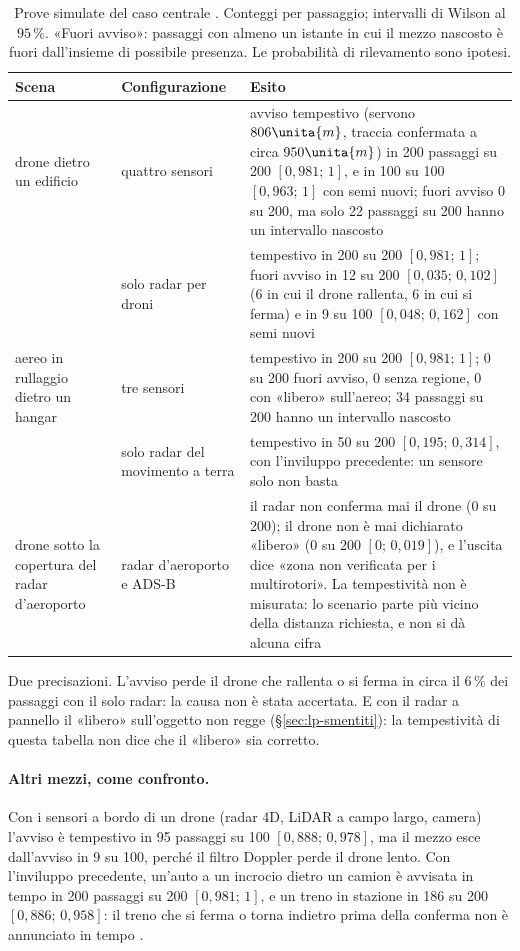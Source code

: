 \begin{table}[H]\centering\footnotesize
\caption{Prove simulate del caso centrale . Conteggi per passaggio; intervalli di Wilson al $95\,\%$. «Fuori avviso»: passaggi con almeno un istante in cui il mezzo nascosto è fuori dall'insieme di possibile presenza. Le probabilità di rilevamento sono ipotesi.}\label{tab:lp-prove}
\begin{tabularx}{\linewidth}{@{}>{\RaggedRight\arraybackslash}p{3.0cm}>{\RaggedRight\arraybackslash}p{2.7cm}L@{}}
\toprule
Scena & Configurazione & Esito\\
\midrule
drone dietro un edificio & quattro sensori & avviso tempestivo (servono $806\unita{m}$, traccia confermata a circa $950\unita{m}$) in 200 passaggi su 200 $[0{,}981;\,1]$, e in 100 su 100 $[0{,}963;\,1]$ con semi nuovi; fuori avviso 0 su 200, ma solo 22 passaggi su 200 hanno un intervallo nascosto\\
 & solo radar per droni & tempestivo in 200 su 200 $[0{,}981;\,1]$; fuori avviso in 12 su 200 $[0{,}035;\,0{,}102]$ (6 in cui il drone rallenta, 6 in cui si ferma) e in 9 su 100 $[0{,}048;\,0{,}162]$ con semi nuovi\\
aereo in rullaggio dietro un hangar & tre sensori & tempestivo in 200 su 200 $[0{,}981;\,1]$; 0 su 200 fuori avviso, 0 senza regione, 0 con «libero» sull'aereo; 34 passaggi su 200 hanno un intervallo nascosto\\
 & solo radar del movimento a terra & tempestivo in 50 su 200 $[0{,}195;\,0{,}314]$, con l'inviluppo precedente: un sensore solo non basta\\
drone sotto la copertura del radar d'aeroporto & radar d'aeroporto e ADS-B & il radar non conferma mai il drone (0 su 200); il drone non è mai dichiarato «libero» (0 su 200 $[0;\,0{,}019]$), e l'uscita dice «zona non verificata per i multirotori». La tempestività non è misurata: lo scenario parte più vicino della distanza richiesta, e non si dà alcuna cifra\\
\bottomrule
\end{tabularx}
\end{table}

Due precisazioni. L'avviso perde il drone che rallenta o si ferma in circa il $6\,\%$ dei passaggi con il solo radar: la causa non è stata accertata. E con il radar a pannello il «libero» sull'oggetto non regge (\S\ref{sec:lp-smentiti}): la tempestività di questa tabella non dice che il «libero» sia corretto.

\paragraph{Altri mezzi, come confronto.} Con i sensori a bordo di un drone (radar 4D, LiDAR a campo largo, camera) l'avviso è tempestivo in 95 passaggi su 100 $[0{,}888;\,0{,}978]$, ma il mezzo esce dall'avviso in 9 su 100, perché il filtro Doppler perde il drone lento. Con l'inviluppo precedente, un'auto a un incrocio dietro un camion è avvisata in tempo in 200 passaggi su 200 $[0{,}981;\,1]$, e un treno in stazione in 186 su 200 $[0{,}886;\,0{,}958]$: il treno che si ferma o torna indietro prima della conferma non è annunciato in tempo .

